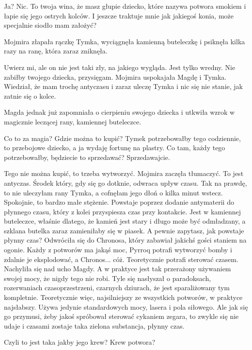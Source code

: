 \ds{} Ja? Nic. To twoja wina, że masz głupie dziecko, które nazywa potwora smokiem i łapie się jego ostrych kolców. 
I jeszcze traktuje mnie jak jakiegoś konia, może specjalnie siodło mam założyć? \de{}

Mojmira złapała rączkę Tymka, wyciągnęła kamienną buteleczkę i psiknęła kilka razy na ranę, która zaraz zniknęła.

\ds{} Uwierz mi, ale on nie jest taki zły, na jakiego wygląda. Jest tylko wredny. Nie zabiłby twojego dziecka, przysięgam. \dm{} Mojmira uspokajała Magdę i Tymka. \dm{}
Wiedział, że mam trochę antyczasu i zaraz uleczę Tymka i nic się nie stanie, jak zatnie się o kolce. \de{}

Magda jednak już zapomniała o cierpieniu swojego dziecka i utkwiła wzrok w magicznie leczącej rany, kamiennej buteleczce.

\ds{} Co to za magia? Gdzie można to kupić? Tymek potrzebowałby tego codziennie, to przebojowe dziecko, a ja wydaję fortunę na plastry.
Co tam, każdy tego potrzebowałby, będziecie to sprzedawać? Sprzedawajcie.\de{}

\ds{} Tego nie można kupić, to trzeba wytworzyć. \dm{} Mojmira zaczęła tłumaczyć. \dm{} To jest antyczas. Środek który, gdy się go dotknie, odwraca upływ czasu. 
Tak na prawdę, to nie uleczyłam rany Tymka, a cofnęłam jego dłoń o kilka minut wstecz. Spokojnie, to bardzo małe stężenie.
Powstaje poprzez dodanie antymaterii do płynnego czasu, który z kolei przyspiesza czas przy kontakcie. 
Jest w kamiennej buteleczce, właśnie dlatego, że kamień jest stary i długo może być odmładzany, a szklana butelka zaraz zamieniłaby się w piasek.
A pewnie zapytasz, jak powstaje płynny czas? 
\dm{} Odwróciła się do Chronosa, który zabawiał jakichś gości staniem na ogonie. \dm{} 
Każdy z potworów ma jakąś moc, Pyrroq potrafi wytworzyć bomby i zdalnie je eksplodować, a Chronos... cóż. Teoretycznie potrafi sterować czasem.
\dm{} Nachyliła się nad ucho Magdy. \dm{} A w praktyce jest tak przerażony używaniem swojej mocy, że nigdy tego nie robi.
Tyle się nasłyszał o paradoksach, rozerwaniach czasoprzestrzeni, czarnych dziurach, że jest sparaliżowany tym kompletnie.
Teoretycznie więc, najsilniejszy ze wszystkich potworów, w praktyce najsłabszy.
Używa jedynie standardowych mocy, lasera i pola siłowego.
Ale jak się go przymusi, żeby jakoś spróbował sterować cykaniem zegara, to zwykle się nie udaje i czasami zostaje taka zielona substancja, płynny czas. \de{}

\ds{} Czyli to jest taka jakby jego krew? Krew potwora? \de{}

